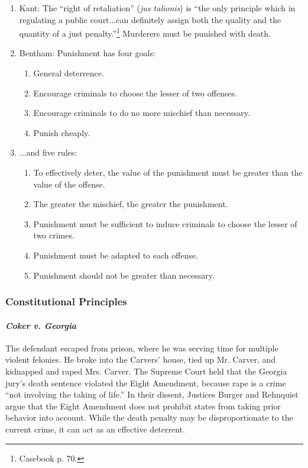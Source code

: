 \begin{enumerate}
    \item Kant: The ``right of retaliation'' (\emph{jus talionis}) is ``the only principle which in regulating a public court...can definitely assign both the quality and the quantity of a just penalty.''\footnote{Casebook p. 70.} Murderers must be punished with death.
    \item Bentham: Punishment has four goals:
    \begin{enumerate}
        \item General deterrence.
        \item Encourage criminals to choose the lesser of two offenses.
        \item Encourage criminals to do no more mischief than necessary.
        \item Punish cheaply.
    \end{enumerate}
    \item ...and five rules:
    \begin{enumerate}
        \item To effectively deter, the value of the punishment must be greater than the value of the offense.
        \item The greater the mischief, the greater the punishment.
        \item Punishment must be sufficient to induce criminals to choose the lesser of two crimes.
        \item Punishment must be adapted to each offense.
        \item Punishment should not be greater than necessary.
    \end{enumerate}
\end{enumerate}

\subsubsection{Constitutional Principles}

\paragraph{\emph{Coker v. Georgia}} The defendant escaped from prison, where he was serving time for multiple violent felonies. He broke into the Carvers' house, tied up Mr. Carver, and kidnapped and raped Mrs. Carver. The Supreme Court held that the Georgia jury's death sentence violated the Eight Amendment, because rape is a crime ``not involving the taking of life.'' In their dissent, Justices Burger and Rehnquist argue that the Eight Amendment does not prohibit states from taking prior behavior into account. While the death penalty may be disproportionate to the current crime, it can act as an effective deterrent.

